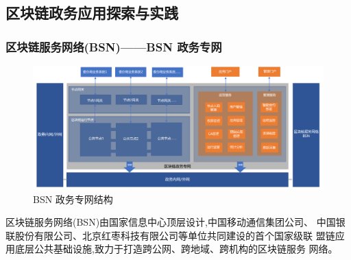 \documentclass[11pt]{beamer}
\begin{document}
\subsection{区块链政务应用探索与实践}
\begin{frame}
	\frametitle{区块链服务网络(BSN)——BSN 政务专网}
	\begin{figure}
		\centering
		\includegraphics[width=0.7\linewidth]{figures/gov/6}
		\caption{BSN 政务专网结构}
		\label{fig:6}
	\end{figure}

	区块链服务网络(BSN)由国家信息中心顶层设计,中国移动通信集团公司、
	中国银联股份有限公司、北京红枣科技有限公司等单位共同建设的首个国家级联
	盟链应用底层公共基础设施,致力于打造跨公网、跨地域、跨机构的区块链服务
	网络。
\end{frame}
\end{document}
